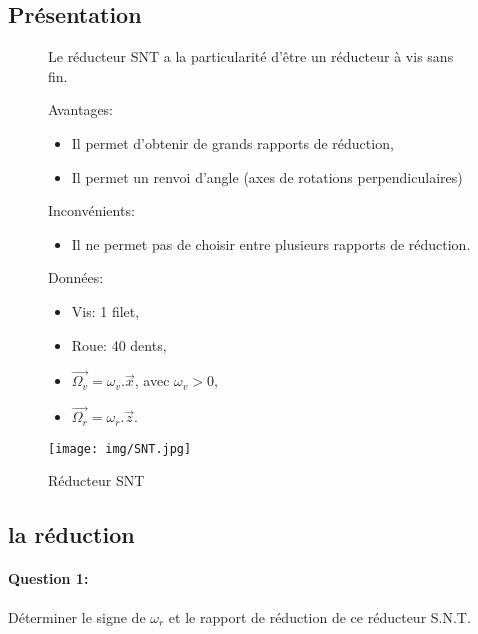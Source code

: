 \subsection{Présentation}

\begin{figure}[!h]
\begin{minipage}{0.6\linewidth}
Le réducteur SNT a la particularité d'être un réducteur à vis sans fin.

Avantages:
\begin{itemize}
 \item Il permet d'obtenir de grands rapports de réduction,
 \item Il permet un renvoi d'angle (axes de rotations perpendiculaires)
\end{itemize}

Inconvénients:
\begin{itemize}
 \item Il ne permet pas de choisir entre plusieurs rapports de réduction.
\end{itemize}

Données:
\begin{itemize}
 \item Vis: 1 filet,
 \item Roue: 40 dents,
 \item $\overrightarrow{\Omega_v}=\omega_v.\overrightarrow{x}$, avec $\omega_v>0$,
 \item $\overrightarrow{\Omega_r}=\omega_r.\overrightarrow{z}$.
\end{itemize}

\end{minipage}
 \hfill
\begin{minipage}{0.35\linewidth}
 \centering\texttt{[image: img/SNT.jpg]}
 \caption{Réducteur SNT}
 \label{fig3}
\end{minipage}
\end{figure}

\subsection{la réduction}

\paragraph{Question 1:} Déterminer le signe de $\omega_r$ et le rapport de réduction de ce réducteur S.N.T.



